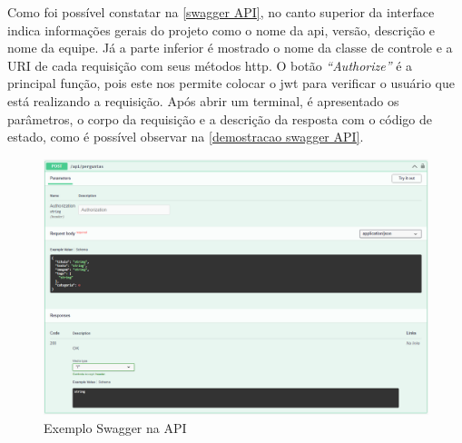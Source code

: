 Como foi possível constatar na \autoref{swagger API}, no canto superior da interface indica informações gerais do projeto como o nome da \acs{api}, versão, descrição e nome da equipe. Já a parte inferior é mostrado o nome da classe de controle e a URI de cada requisição com seus métodos \acs{http}. O botão \textit{``Authorize''} é a principal função, pois este nos permite colocar o \acs{jwt} para verificar o usuário que está realizando a requisição. Após abrir um terminal, é apresentado os parâmetros, o corpo da requisição e a descrição da resposta com o código de estado, como é possível observar na \autoref{demostracao swagger API}.

\begin{figure}[htb]
\centering
\caption{\label{demostracao swagger API} Exemplo Swagger na API}
\includegraphics[width=1\textwidth]{anexos/Imagens_Swagger/API_swagger_demostracao.png}
\end{figure}
\FloatBarrier
